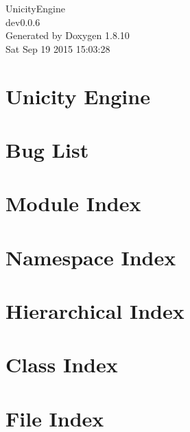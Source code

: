 \documentclass[twoside]{book}
\newcommand{\+}{\discretionary{\mbox{\scriptsize$\hookleftarrow$}}{}{}}
\newcommand{\clearemptydoublepage}{%
  \newpage{\pagestyle{empty}\cleardoublepage}%
}
\begin{document}
\hypersetup{pageanchor=false,
             bookmarks=true,
             bookmarksnumbered=true,
             pdfencoding=unicode
            }
\begin{titlepage}
\vspace*{7cm}
\begin{center}%
{\Large Unicity\+Engine \\[1ex]\large dev0.\+0.\+6 }\\
\vspace*{1cm}
{\large Generated by Doxygen 1.8.10}\\
\vspace*{0.5cm}
{\small Sat Sep 19 2015 15:03:28}\\
\end{center}
\end{titlepage}
\clearemptydoublepage
\tableofcontents
\clearemptydoublepage
{}
\hypersetup{pageanchor=true}

\chapter{Unicity Engine}
\label{md__g_1__libraries__v_s_projects__untitled_game__unicity_engine__r_e_a_d_m_e}
\hypertarget{md__g_1__libraries__v_s_projects__untitled_game__unicity_engine__r_e_a_d_m_e}{}

\chapter{Bug List}
\label{bug}
\hypertarget{bug}{}

\chapter{Module Index}

\chapter{Namespace Index}

\chapter{Hierarchical Index}

\chapter{Class Index}

\chapter{File Index}

\end{document}
